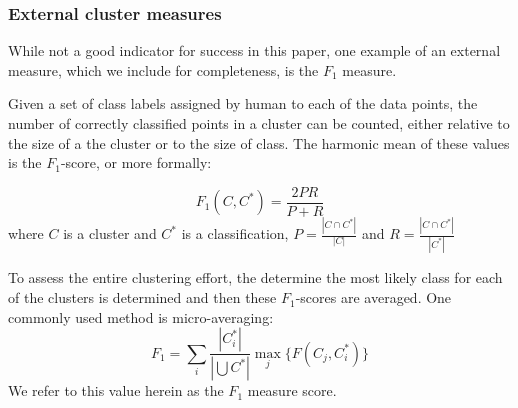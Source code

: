 \subsubsection{External cluster measures}  While not a good indicator for success in this paper, one example of an external measure, which we include for completeness, is the $F_1$ measure.  

Given a set of class labels assigned by human to each of the data points, the number of correctly classified points in a cluster can be counted, either relative to the size of a the cluster or to the size of class.  The harmonic mean of these values is the $F_1$-score, or more formally:

\[
	F_1(C, C^*) = \frac{2PR}{P + R}
\]
where $C$ is a cluster and $C^*$ is a classification, $P = \frac{|C \cap C^*|}{|C|}$ and $R = \frac{|C \cap C^*|}{|C^*|}$

To assess the entire clustering effort, the determine the most likely class for each of the clusters is determined and then these $F_1$-scores are averaged.  One commonly used method is micro-averaging:
\[
	F_1 = \sum_i \frac{|C^*_i|}{| \bigcup C^*|} \max_{j} \{F(C_j, C^*_i)\}
\]
We refer to this value herein as the $F_1$ measure score.





